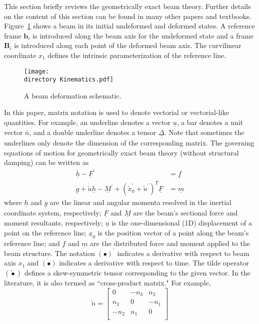 \documentclass{aiaa-tc}
\def\directory{EPSF/}
\renewcommand{\vec}[1]{\underline{#1}}
\renewcommand{\skew}[1]{\widetilde{#1}}
\begin{document}
This section briefly reviews the geometrically exact beam theory. Further details on the content of this section can be found in many other papers\cite{YuGEBT} and textbooks. \cite{HodgesBeamBook,Bauchau:2010}
Figure~\ref{Kinematics} shows a beam in its initial undeformed
and deformed states. A reference frame $\mathbf{b}_i$ is introduced along the
beam axis for the undeformed state and a frame $\mathbf{B}_i$ is introduced
along each point of the deformed beam axis. The curvilinear coordinate $x_1$ defines the intrinsic parameterization of the reference line.
\begin{figure}
\centering
\texttt{[image: \\directory Kinematics.pdf]}
\caption{A beam deformation schematic.} \label{Kinematics}
\end{figure}
In this paper, matrix notation is used to denote vectorial or vectorial-like quantities. For example, an underline denotes a vector $\underline{u}$, a bar denotes a unit vector $\bar{n}$, and a double underline denotes a tensor $\underline{\underline{\Delta}}$. Note that sometimes the underlines only denote the dimension of the corresponding matrix. The governing equations of motion for geometrically exact beam theory (without structural damping) can be written as \cite{Bauchau:2010}
\begin{align}
	\label{GovernGEBT-1}
	\dot{\underline{h}} - \underline{F}^\prime &= \underline{f} \\
	\label{GovernGEBT-2}
	\dot{\underline{g}} + \dot{\tilde{u}} \underline{h} - \underline{M}^\prime + (\tilde{x}_0^\prime + \tilde{u}^\prime)^T \underline{F} &= \underline{m}
\end{align}
where $\vec{h}$ and $\vec{g}$ are the linear and angular momenta resolved in the inertial coordinate system, respectively; $\vec{F}$ and $\vec{M}$ are the beam's sectional force and moment resultants, respectively; $\vec{u}$ is the one-dimensional (1D) displacement of a point on the reference line; $\vec{x}_0$ is the position vector of a point along the beam's reference line;  and $\vec{f}$ and $\vec{m}$ are the distributed force and moment applied to the beam structure.  The notation $(\bullet)^\prime$ indicates a derivative with respect to beam axis $x_1$ and $\dot{(\bullet)}$ indicates a derivative with respect to time. The tilde operator $(\skew{\bullet})$ defines a skew-symmetric tensor corresponding to the given vector. In the literature, it is also termed as ``cross-product matrix." For example,
\[
	\skew{n} = 
	     		\begin{bmatrix}
			0 & -n_3 & n_2 \\
			n_3 & 0 & -n_1 \\
			-n_2 & n_1 & 0\\
			\end{bmatrix}	
\]
\end{document}
